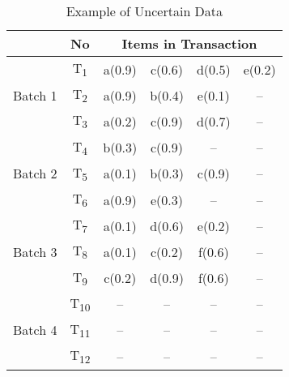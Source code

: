 %
%
\begin{table}[t]
\centering

\begin{tabular}{|c|c|c|c|c|c|}
\hline
& No & \multicolumn{4}{c|}{Items in Transaction} \\ \hline \hline
\multirow{3}{*}{Batch 1}	&	T\textsubscript{1} & a(0.9) & c(0.6) & d(0.5) & e(0.2)\\
							&	T\textsubscript{2} & a(0.9) & b(0.4) & e(0.1) & --    \\
							&	T\textsubscript{3} & a(0.2) & c(0.9) & d(0.7) & --    \\\hline
\multirow{3}{*}{Batch 2}	&	T\textsubscript{4} & b(0.3) & c(0.9) & -- & --\\
							&	T\textsubscript{5} & a(0.1) & b(0.3) & c(0.9) & --    \\
							&	T\textsubscript{6} & a(0.9) & e(0.3) & -- & --        \\\hline
\multirow{3}{*}{Batch 3}	&	T\textsubscript{7} & a(0.1) & d(0.6) & e(0.2) & --    \\
							&	T\textsubscript{8} & a(0.1) & c(0.2) & f(0.6) & --    \\
							&	T\textsubscript{9} & c(0.2) & d(0.9) & f(0.6) & --    \\\hline
							
\multirow{3}{*}{Batch 4}	&	T\textsubscript{10} &  --  &  --  &  --  & --    \\
							&	T\textsubscript{11} &  --  &  --  &  --  & --    \\
							&	T\textsubscript{12} &  --  &  --  &  --  & --    \\\hline
\end{tabular}
\caption{Example of Uncertain Data}
\label{table:transaction_batch}
\end{table}


%
%